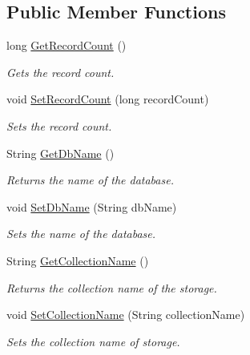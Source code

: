 \subsection*{Public Member Functions}
\begin{DoxyCompactItemize}
\item 
long \hyperlink{classcom_1_1shephertz_1_1app42_1_1paas_1_1sdk_1_1windows_1_1storage_1_1_storage_ac70dd22c3c7eee4fc87eccfa5383ca1e}{Get\+Record\+Count} ()
\begin{DoxyCompactList}\small\item\em Gets the record count. \end{DoxyCompactList}\item 
void \hyperlink{classcom_1_1shephertz_1_1app42_1_1paas_1_1sdk_1_1windows_1_1storage_1_1_storage_a14ccecf8ec3906467bfcb7eba810481f}{Set\+Record\+Count} (long record\+Count)
\begin{DoxyCompactList}\small\item\em Sets the record count. \end{DoxyCompactList}\item 
String \hyperlink{classcom_1_1shephertz_1_1app42_1_1paas_1_1sdk_1_1windows_1_1storage_1_1_storage_a19755b45268ebccae4144ee32dad5211}{Get\+Db\+Name} ()
\begin{DoxyCompactList}\small\item\em Returns the name of the database. \end{DoxyCompactList}\item 
void \hyperlink{classcom_1_1shephertz_1_1app42_1_1paas_1_1sdk_1_1windows_1_1storage_1_1_storage_a339676671c0c1d1959465108d227b61c}{Set\+Db\+Name} (String db\+Name)
\begin{DoxyCompactList}\small\item\em Sets the name of the database. \end{DoxyCompactList}\item 
String \hyperlink{classcom_1_1shephertz_1_1app42_1_1paas_1_1sdk_1_1windows_1_1storage_1_1_storage_a4f45caac5d1f51ce27b4f435c50d67ec}{Get\+Collection\+Name} ()
\begin{DoxyCompactList}\small\item\em Returns the collection name of the storage. \end{DoxyCompactList}\item 
void \hyperlink{classcom_1_1shephertz_1_1app42_1_1paas_1_1sdk_1_1windows_1_1storage_1_1_storage_a7a2b6b3d5c177c971ccdc0f99b1f7cd1}{Set\+Collection\+Name} (String collection\+Name)
\begin{DoxyCompactList}\small\item\em Sets the collection name of storage. \end{DoxyCompactList}\item 

\end{DoxyCompactItemize}
